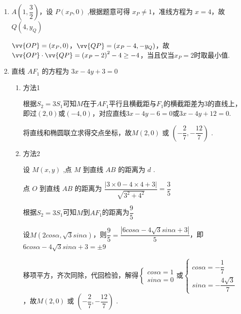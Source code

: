 \begin{enumerate}
\begin{enumerate}
\begin{jieda}
\begin{enumerate}
        由椭圆定义可得: $\left| {A{F}_{1}}\right|  + \left| {A{F}_{2}}\right|  = 4$，因此$\bigtriangleup A{F}_{1}{F}_{2}$ 的周长为 $4 + 2 = 6$
        \item $A\left( {1,\dfrac{3}{2}}\right)$，设 $P\left( {{x}_P,0}\right)$ ,根据题意可得 ${x}_P \neq  1$，准线方程为 $x = 4$，故$Q\left( {4,{y}_{Q}}\right)$

        $\vv{OP} = (x_P, 0)$，$\vv{QP} = (x_P-4, -y_Q)$，故$\vv{OP} \cdot  \vv{QP} = {\left( {x}_P - 2\right) }^{2} - 4 \geq   - 4$，当且仅当$x_P = 2$时取最小值.

        \item 直线 $A{F}_{1}$ 的方程为 ${3x} - {4y} + 3 = 0$
        \begin{enumerate}
            \item 方法1 

            根据${S}_{2} = 3{S}_{1}$可知$M$在于$AF_1$平行且横截距与$F_1$的横截距差为$3$的直线上，即过$(2, 0)$或$(-4, 0)$，对应直线${3x} - {4y} -6 = 0$或$3x-4y+12=0$.

            将直线和椭圆联立求得交点坐标，故$M\left( {2,0}\right)$ 或 $\left( {-\dfrac{2}{7}, - \dfrac{12}{7}}\right)$ .

            \item 方法2

            设 $M\left( {x,y}\right)$ ,点 $M$ 到直线 ${AB}$ 的距离为 $d$ .
    
            点 $O$ 到直线 ${AB}$ 的距离为 $\dfrac{\left| 3 \times  0 - 4 \times  4 + 3\right| }{\sqrt{{3}^{2} + {4}^{2}}} = \dfrac{3}{5}$
            
            根据${S}_{2} = 3{S}_{1}$可知$M$到$AF_1$的距离为$\dfrac{9}{5}$
    
            设$M(2cos\alpha, \sqrt{3}sin\alpha)$，则$\dfrac{9}{5} = \dfrac{|6cos\alpha-4\sqrt{3}sin\alpha+3|}{5}$，即$6cos\alpha-4\sqrt{3}sin\alpha+3 = \pm 9$
            
            移项平方，齐次同除，代回检验，解得$\left\{\begin{array}{l}
                 cos\alpha = 1  \\
                 sin\alpha = 0
            \end{array}\right.$或$\left\{\begin{array}{l}
                 cos\alpha = -\dfrac{1}{7}  \\
                 sin\alpha = -\dfrac{4\sqrt{3}}{7}
            \end{array}\right.$，故$M\left( {2,0}\right)$ 或 $\left( {-\dfrac{2}{7}, - \dfrac{12}{7}}\right)$ .
        \end{enumerate}
    \end{enumerate}
    \end{jieda}
    \end{enumerate}



\end{enumerate}
